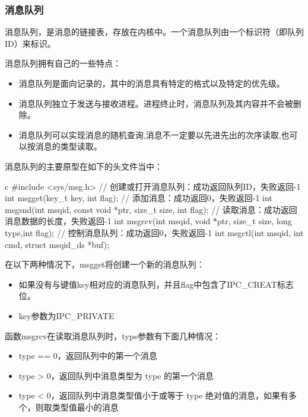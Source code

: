 \subsubsection{消息队列}
消息队列，是消息的链接表，存放在内核中。一个消息队列由一个标识符（即队列ID）来标识。

消息队列拥有自己的一些特点：
\begin{itemize}
    \item 消息队列是面向记录的，其中的消息具有特定的格式以及特定的优先级。
    \item 消息队列独立于发送与接收进程。进程终止时，消息队列及其内容并不会被删除。
    \item 消息队列可以实现消息的随机查询,消息不一定要以先进先出的次序读取,也可以按消息的类型读取。
\end{itemize}

消息队列的主要原型在如下的头文件当中：
\begin{code-block}{c}
#include <sys/msg.h>
// 创建或打开消息队列：成功返回队列ID，失败返回-1
int msgget(key_t key, int flag);
// 添加消息：成功返回0，失败返回-1
int msgsnd(int msqid, const void *ptr, size_t size, int flag);
// 读取消息：成功返回消息数据的长度，失败返回-1
int msgrcv(int msqid, void *ptr, size_t size, long type,int flag);
// 控制消息队列：成功返回0，失败返回-1
int msgctl(int msqid, int cmd, struct msqid_ds *buf);
\end{code-block}

在以下两种情况下，msgget将创建一个新的消息队列：
\begin{itemize}
    \item 如果没有与键值key相对应的消息队列，并且flag中包含了IPC\_CREAT标志位。
    \item key参数为IPC\_PRIVATE
\end{itemize}

函数msgrcv在读取消息队列时，type参数有下面几种情况：
\begin{itemize}
    \item type == 0，返回队列中的第一个消息
    \item type > 0，返回队列中消息类型为 type 的第一个消息
    \item type < 0，返回队列中消息类型值小于或等于 type 绝对值的消息，如果有多个，则取类型值最小的消息
\end{itemize}

